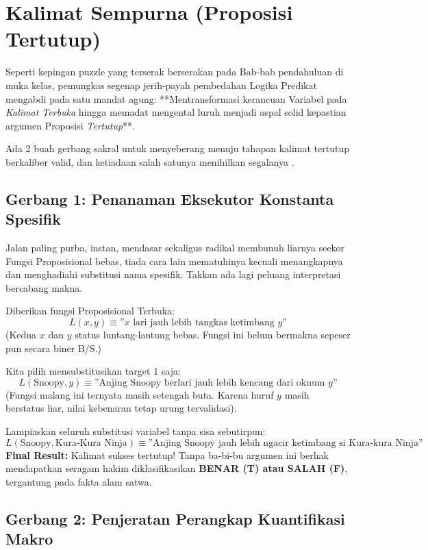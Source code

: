 \section{Kalimat Sempurna (Proposisi Tertutup)}

Seperti kepingan puzzle yang terserak berserakan pada Bab-bab pendahuluan di muka kelas, pemungkas segenap jerih-payah pembedahan Logika Predikat mengabdi pada satu mandat agung: **Mentransformasi kerancuan Variabel pada \textit{Kalimat Terbuka} hingga memadat mengental luruh menjadi aspal solid kepastian argumen Proposisi \textit{Tertutup}**. 

Ada 2 buah gerbang sakral untuk menyeberang menuju tahapan kalimat tertutup berkaliber valid, dan ketiadaan salah satunya menihilkan segalanya \cite{rosen2019}.

\subsection{Gerbang 1: Penanaman Eksekutor Konstanta Spesifik}

Jalan paling purba, instan, mendasar sekaligus radikal membunuh liarnya seekor Fungsi Proposisional bebas, tiada cara lain mematuhinya kecuali menangkapnya dan menghadiahi substitusi nama spesifik. Takkan ada lagi peluang interpretasi bercabang makna.

\begin{contoh}
Diberikan fungsi Proposisional Terbuka: \[ L(x, y) \equiv \text{''}x \text{ lari jauh lebih tangkas ketimbang } y\text{''} \]
(Kedua $x$ dan $y$ status luntang-lantung bebas. Fungsi ini belum bermakna sepeser pun secara biner B/S.)

Kita pilih mensubstitusikan target 1 saja:
\[ L(\text{Snoopy}, y) \equiv \text{''Anjing Snoopy berlari jauh lebih kencang dari oknum } y\text{''} \]
(Fungsi malang ini ternyata masih setengah buta. Karena huruf $y$ masih berstatus liar, nilai kebenaran tetap urung tervalidasi).

Lampiaskan seluruh substitusi variabel tanpa sisa sebutirpun:
\[ L(\text{Snoopy}, \text{Kura-Kura Ninja}) \equiv \text{''Anjing Snoopy jauh lebih ngacir ketimbang si Kura-kura Ninja''} \]
\textbf{Final Result:} Kalimat sukses tertutup! Tanpa ba-bi-bu argumen ini berhak mendapatkan seragam hakim diklasifikasikan \textbf{BENAR (T) atau SALAH (F)}, tergantung pada fakta alam satwa.
\end{contoh}

\subsection{Gerbang 2: Penjeratan Perangkap Kuantifikasi Makro}

